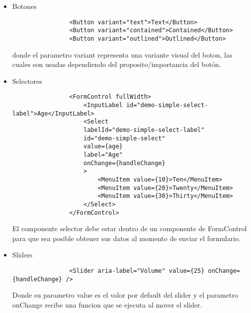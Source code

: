         \begin{itemize}
            \item Botones\\

            \begin{lstlisting}
                <Button variant="text">Text</Button>
                <Button variant="contained">Contained</Button>
                <Button variant="outlined">Outlined</Button>
            \end{lstlisting}

            donde el parametro variant representa una variante visual del boton, las cuales son usadas dependiendo del proposito/importancia del botón.

            \item Selectores\\

            \begin{lstlisting}
                <FormControl fullWidth>
                    <InputLabel id="demo-simple-select-label">Age</InputLabel>
                    <Select
                    labelId="demo-simple-select-label"
                    id="demo-simple-select"
                    value={age}
                    label="Age"
                    onChange={handleChange}
                    >
                        <MenuItem value={10}>Ten</MenuItem>
                        <MenuItem value={20}>Twenty</MenuItem>
                        <MenuItem value={30}>Thirty</MenuItem>
                    </Select>
                </FormControl>
            \end{lstlisting}

            El componente selector debe estar dentro de un componente de FormControl para que sea posible obtener sus datos al momento de enviar el formulario.

            \item Sliders\\

            \begin{lstlisting}
                <Slider aria-label="Volume" value={25} onChange={handleChange} />
            \end{lstlisting}

            Donde su parametro value es el valor por default del slider y el parametro onChange recibe una funcion que se ejecuta al mover el slider.

        \end{itemize}


